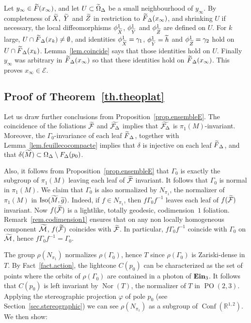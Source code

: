 \documentclass[11pt]{article}
\theoremstyle{definition}
\numberwithin{equation}{section}
\numberwithin{figure}{section}
\numberwithin{table}{section}
\DeclareMathOperator{\Conf}{Conf}
\DeclareMathOperator{\Iso}{Iso}
\DeclareMathOperator{\Nor}{Nor}
\DeclareMathOperator{\ein}{{\bf Ein}_3}
\newcommand{\tcalm}{\tilde{\mathcal{M}}}
\newcommand{\tm}{\tilde{{M}}}
\newcommand{\tX}{\tilde{{X}}}
\newcommand{\tY}{\tilde{{Y}}}
\newcommand{\tZ}{\tilde{{Z}}}
\newcommand{\tcalf}{\tilde{{\mathcal{F}}}}
\newcommand{\tFd}{\tilde{{F}}_{\Delta}}
\newcommand{\tF}{\tilde{{F}}}
\newcommand{\tth}{\tilde{h}}
\newcommand{\tcalfd}{\tilde{{\mathcal{F}_{\Delta}}}}
\newcommand*\RR{\mathbb{R}}
\DeclareMathOperator{\POop}{PO}
\newcommand{\PO}{{\POop(2,3)}}
\let\oldtilde\tilde
\renewcommand*\tilde[1]{\mathchoice{\widetilde{#1}}{\widetilde{#1}}{\widetilde{#1}}{\oldtilde{#1}}}
\begin{document}
Let $y_{\infty} \in \tF(x_{\infty})$, and let $U \subset \tilde{\Omega}_{\Delta}$ be a small neighbourhood of $y_{\infty}$. By completeness of $\tX,\ \tY$ and $\tZ$ in restriction to $\tFd(x_{\infty})$, and shrinking $U$ if necessary, the local diffeomorphisms $\phi_{\tX}^1$, $\phi_{\tY}^1$ and $\phi_{\tZ}^1$ are defined on $U$. For $k$ large, $U \cap \tFd(x_k) \not = \emptyset$, and identities $\phi_{\tX}^1=\gamma_1$, $\phi_{\tY}^1=\tth$ and $\phi_{\tZ}^1=\gamma_2$ hold on $U \cap \tFd(x_k)$. Lemma~\ref{lem.coincide} says that those identities hold on $U$. Finally $y_{\infty}$ was arbitrary in $\tFd(x_{\infty})$ so that these identities hold on $\tFd(x_{\infty})$. This proves $x_{\infty} \in {\mathcal E}$.



\subsection{Proof of Theorem~\ref{th.theoplat}}\label{sec.conclusion}
Let us draw further conclusions from Proposition~\ref{prop.ensembleE}. The coincidence of the foliations $\tcalf$ and $\tcalfd$ implies that $\tcalfd$ is $\pi_1(M)$-invariant. Moreover, the $\Gamma_0$-invariance of each leaf $\tFd$, together with Lemma~\ref{lem.feuillecocompacte} implies that $\delta$ is injective on each leaf $\tFd$, and that $\delta(\tm) \subset \Omega_{\Delta} \setminus F_{\Delta}(p_0)$.

Also, it follows from Proposition~\ref{prop.ensembleE} that $\Gamma_0$ is exactly the subgroup of $\pi_1(M)$ leaving each leaf of $\tcalf$ invariant. It follows that $\Gamma_0$ is normal in $\pi_1(M)$. We claim that $\Gamma_0$ is also normalized by $N_{\pi_1}$, the normalizer of $\pi_1(M)$ in $\Iso(\tm,\tilde{g})$. Indeed, if $f \in N_{\pi_1}$, then $f\Gamma_0 f^{-1}$ leaves each leaf of $f(\tcalf)$ invariant. Now $f(\tcalf)$ is a lightlike, totally geodesic, codimension~$1$ foliation. Remark~\ref{rem.codimension1} ensures that on any non locally homogeneous component $\tcalm$, $f(\tcalf)$ coincides with $\tcalf$. In particular, $f\Gamma_0 f^{-1}$ coincide with $\Gamma_0$ on $\tcalm$, hence $f\Gamma_0f^{-1}=\Gamma_0$.


The group $\rho(N_{\pi_1})$ normalizes $\rho(\Gamma_0)$, hence $T$ since $\rho(\Gamma_0)$ is Zariski-dense in $T$. By Fact~\ref{fact.action}, the lightcone $C(p_0)$ can be characterized as the set of points where the orbits of $\rho(\Gamma_0)$ are contained in a photon of $\ein$. It follows that $C(p_0)$ is left invariant by $\Nor(T)$, the normalizer of $T$ in $\PO$. Applying the stereographic projection $\varphi$ of pole $p_0$ (see Section~\ref{sec.stereographic}) we can see $\rho(N_{\pi_1})$ as a subgroup of $\Conf(\RR^{1,2})$. We then show:
\end{document}
